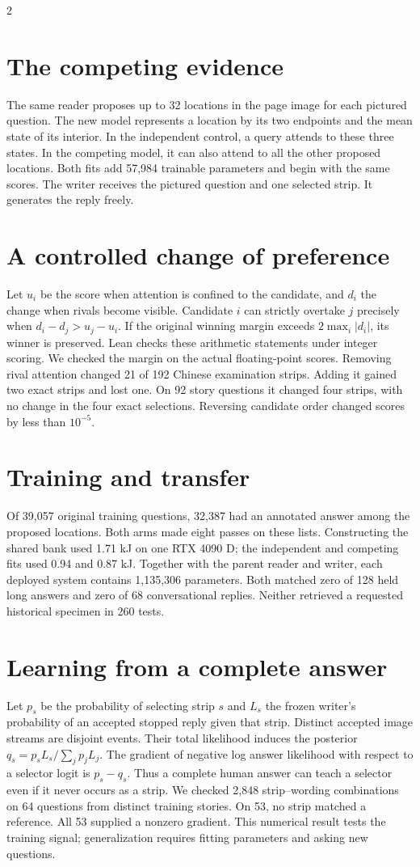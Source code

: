 \begin{multicols}{2}
\section*{The competing evidence}
The same reader proposes up to 32 locations in the page image for each pictured question. The new model represents a location by its two endpoints and the mean state of its interior. In the independent control, a query attends to these three states. In the competing model, it can also attend to all the other proposed locations. Both fits add 57,984 trainable parameters and begin with the same scores. The writer receives the pictured question and one selected strip. It generates the reply freely.
\section*{A controlled change of preference}
Let $u_i$ be the score when attention is confined to the candidate, and $d_i$ the change when rivals become visible. Candidate $i$ can strictly overtake $j$ precisely when $d_i-d_j>u_j-u_i$. If the original winning margin exceeds $2\max_i|d_i|$, its winner is preserved. Lean checks these arithmetic statements under integer scoring. We checked the margin on the actual floating-point scores. Removing rival attention changed 21 of 192 Chinese examination strips. Adding it gained two exact strips and lost one. On 92 story questions it changed four strips, with no change in the four exact selections. Reversing candidate order changed scores by less than $10^{-5}$.
\section*{Training and transfer}
Of 39,057 original training questions, 32,387 had an annotated answer among the proposed locations. Both arms made eight passes on these lists. Constructing the shared bank used 1.71 kJ on one RTX 4090 D; the independent and competing fits used 0.94 and 0.87 kJ. Together with the parent reader and writer, each deployed system contains 1,135,306 parameters. Both matched zero of 128 held long answers and zero of 68 conversational replies. Neither retrieved a requested historical specimen in 260 tests.
\section*{Learning from a complete answer}
Let $p_s$ be the probability of selecting strip $s$ and $L_s$ the frozen writer's probability of an accepted stopped reply given that strip. Distinct accepted image streams are disjoint events. Their total likelihood induces the posterior $q_s=p_sL_s/\sum_j p_jL_j$. The gradient of negative log answer likelihood with respect to a selector logit is $p_s-q_s$. Thus a complete human answer can teach a selector even if it never occurs as a strip. We checked 2,848 strip--wording combinations on 64 questions from distinct training stories. On 53, no strip matched a reference. All 53 supplied a nonzero gradient. This numerical result tests the training signal; generalization requires fitting parameters and asking new questions.
\end{multicols}
